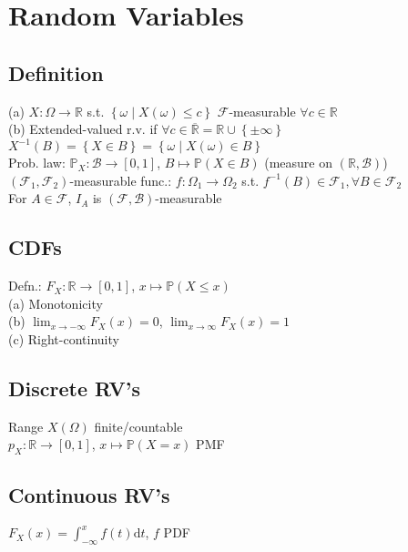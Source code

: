 \section{Random Variables}

	\subsection*{Definition}
	(a) $X: \Omega\to\mathbb{R}$ s.t. $\left\{\omega\mid X\left(\omega\right)\leq c\right\}$ $\mathcal{F}$-measurable $\forall c\in\mathbb{R}$\\
	(b) Extended-valued r.v. if $\forall c\in\overline{\mathbb{R}} = \mathbb{R}\cup\left\{\pm\infty\right\}$\\
	$X^{-1}\left(B\right) = \left\{X\in B\right\} = \left\{\omega\mid X\left(\omega\right)\in B\right\}$\\
	Prob. law: $\mathbb{P}_{X}: \mathcal{B}\to\left[0, 1\right]$, $B\mapsto\mathbb{P}\left(X\in B\right)$ (measure on $\left(\mathbb{R}, \mathcal{B}\right)$)\\
	$\left(\mathcal{F}_{1}, \mathcal{F}_{2}\right)$-measurable func.: $f: \Omega_{1}\to\Omega_{2}$ s.t. $f^{-1}\left(B\right)\in\mathcal{F}_{1}, \forall B\in\mathcal{F}_{2}$\\
	For $A\in\mathcal{F}$, $I_{A}$ is $\left(\mathcal{F}, \mathcal{B}\right)$-measurable
	
	\subsection*{CDFs}
	Defn.: $F_{X}: \mathbb{R}\to\left[0, 1\right]$, $x\mapsto\mathbb{P}\left(X\leq x\right)$\\
	(a) Monotonicity\\
	(b) $\lim_{x\to-\infty}F_{X}\left(x\right) = 0$, $\lim_{x\to\infty}F_{X}\left(x\right) = 1$\\
	(c) Right-continuity
	
	\subsection*{Discrete RV's}
	Range $X\left(\Omega\right)$ finite/countable\\
	$p_{X}: \mathbb{R}\to\left[0, 1\right]$, $x\mapsto\mathbb{P}\left(X = x\right)$ PMF
	
	\subsection*{Continuous RV's}
	$F_{X}\left(x\right) = \int_{-\infty}^{x}\!f(t)\mathrm{d}t$, $f$ PDF
	